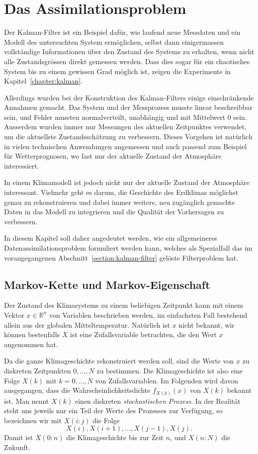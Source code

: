 %
%
%
\section{Das Assimilationsproblem\label{section:assimilationsproblem}}
Der Kalman-Filter ist ein Beispiel dafür, wie laufend neue Messdaten und
ein Modell des untersuchten System ermöglichen, selbst dann einigermassen
vollständige Informationen über den Zustand des Systems zu erhalten, wenn
nicht alle Zustandsgrössen direkt gemessen werden.
Dass dies sogar für ein chaotisches System bis zu einem gewissen Grad
möglich ist, zeigen die Experimente in Kapitel~\ref{chapter:kalman}.

Allerdings wurden bei der Konstruktion des Kalman-Filters einige
einschränkende Annahmen gemacht.
Das System und der Messprozess musste linear beschreibbar sein, 
und Fehler mussten normalverteilt, unabhängig und mit Mittelwert $0$ sein.
Ausserdem wurden immer nur Messungen des aktuellen Zeitpunktes verwendet,
um die aktuellste Zustandsschätzung zu verbessern.
Dieses Vorgehen ist natürlich in vielen technischen Anwendungen angemessen
und auch passend zum Beispiel für Wetterprognosen, wo fast nur der aktuelle
Zustand der Atmosphäre interessiert.

In einem Klimamodell ist jedoch nicht nur der aktuelle Zustand der Atmosphäre
interessant.
Vielmehr geht es darum, die Geschichte des Erdklimas möglichst genau
zu rekonstruieren und dabei immer weitere, neu zugänglich gemachte 
Daten in das Modell zu integrieren und die Qualität der Vorhersagen zu
verbessern.

In diesem Kapitel soll daher angedeutet werden, wie ein allgemeineres
Datenassimilationsproblem formuliert werden kann, welches als Spezialfall
das im vorangegangenen Abschnitt~\ref{section:kalman-filter} gelöste
Filterproblem hat.

\subsection{Markov-Kette und Markov-Eigenschaft\label{subsection:markov}}
Der Zustand des Klimasystems zu einem beliebigen Zeitpunkt kann mit einem
Vektor $x\in\mathbb R^n$ von Variablen beschrieben werden, im einfachsten
Fall bestehend allein aus der globalen Mitteltemperatur.
Natürlich ist $x$ nicht bekannt, wir können bestenfalls $X$ ist eine
Zufallsvariable betrachten, die den Wert $x$ angenommen hat.

Da die ganze Klimageschichte rekonstruiert werden soll, sind die Werte von
$x$ zu diskreten Zeitpunkten $0,\dots,N$ zu bestimmen.
Die Klimageschichte ist also eine Folge $X(k)$ mit $k=0,\dots,N$ von
Zufallsvariablen.
Im Folgenden wird davon ausgegangen, dass die Wahrscheinlichkeitsdichte
$f_{X(k)}(x)$ von $X(k)$ bekannt ist.
Man nennt $X(k)$ einen diskreten {\em stochastischen Prozess}.
%
%
In der Realität steht uns jeweils nur ein Teil der Werte des Prozesses zur
Verfügung, so bezeichnen wir mit $X(i:j)$ die Folge
\[
X(i),X(i+1),\dots,X(j-1),X(j).
\]
Damit ist $X(0:n)$ die Klimageschichte bis zur Zeit $n$, und $X(n:N)$ die
Zukunft.

